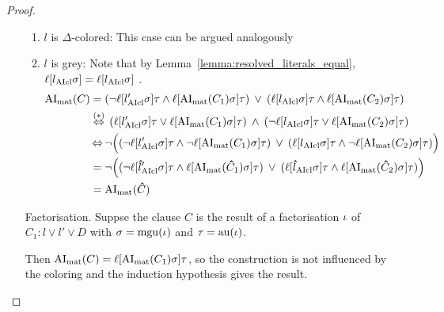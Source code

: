 \documentclass[,%
	draft=false,%
	numbers=noendperiod
	11pt,
	a4paper,
	oneside,%
	openany,
]{memoir}
\begin{document}
\begin{proof}
\begin{itemize}
\begin{enumerate}
				\item $l$ is $\Delta$-colored:
					This case can be argued analogously

				\item $l$ is grey:
					Note that by Lemma~\ref{lemma:resolved_literals_equal}, $\ell[l_{\operatorname{AIcl}}\sigma] = \ell[l_{\operatorname{AIcl}}\sigma]$ \markB.
					\begin{align*}
						\operatorname{AI}_\mathrm{mat}(C) &=
						(\lnot {\ell[l'\ensuremath{_{\operatorname{AIcl}}}\sigma]}\tau \land \ell[\operatorname{AI}_\mathrm{mat}(C_1)\sigma]\tau) \;\,{\lor}\;\, 
						(\ell[l_{\operatorname{AIcl}}\sigma]\tau \land \ell[\operatorname{AI}_\mathrm{mat}(C_2)\sigma]\tau)\\
						&\stackrel{(*)}{\operatorname{\Leftrightarrow}}\,
						({\ell[l'_{\operatorname{AIcl}}\sigma]}\tau \lor \ell[\operatorname{AI}_\mathrm{mat}(C_1)\sigma]\tau) \;\,{\land}\;\, 
						(\lnot \ell[l_{\operatorname{AIcl}}\sigma]\tau \lor \ell[\operatorname{AI}_\mathrm{mat}(C_2)\sigma]\tau)\\
						&\operatorname{\Leftrightarrow} \lnot \Big( (\lnot {\ell[l'\ensuremath{_{\operatorname{AIcl}}}\sigma]}\tau \land \lnot \ell[\operatorname{AI}_\mathrm{mat}(C_1)\sigma]\tau) \;\,{\lor}\;\, 
						(\ell[l_{\operatorname{AIcl}}\sigma]\tau \land \lnot\ell[\operatorname{AI}_\mathrm{mat}(C_2)\sigma]\tau) \Big) \\
						&=\lnot \Big( (\lnot {\ell[\bm\hat l'\ensuremath{_{\operatorname{AIcl}}}\sigma]}\tau \land \ell[\operatorname{AI}_\mathrm{mat}(\bm\hat C_1)\sigma]\tau) \;\,{\lor}\;\, 
						(\ell[\bm\hat l_{\operatorname{AIcl}}\sigma]\tau \land \ell[\operatorname{AI}_\mathrm{mat}(\bm\hat C_2)\sigma]\tau) \Big)\\
						& = \operatorname{AI}_\mathrm{mat}(\bm\hat C) 
					\end{align*}


			\end{enumerate}



		\item[Factorisation.]
			Suppse the clause $C$ is the result of a factorisation $\iota$ of $C_1: l \lor l' \lor D$ 
with $\sigma = \operatorname{mgu}(\iota)$ and $\tau = \operatorname{au}(\iota)$.

			Then $\operatorname{AI}_\mathrm{mat}(C) = \ell[\operatorname{AI}_\mathrm{mat}(C_1)\sigma]\tau$, so the construction is not influenced by the coloring and the induction hypothesis gives the result.
			\qedhere
	\end{itemize}
\end{proof}
\end{document}

